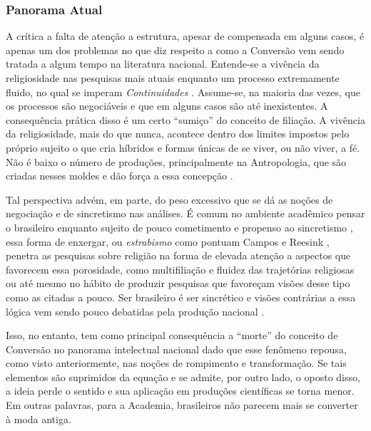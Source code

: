 \documentclass[
	12pt,				%
	oneside,			%
	a4paper,			%
	sumario=tradicional,
	english,			%
	brazil				%
	]{abntex2}
\begin{document}
\hypertarget{panorama-atual}{%
\subsubsection{Panorama Atual}\label{panorama-atual}}

A crítica a falta de atenção a estrutura, apesar de compensada em alguns casos, é apenas um dos problemas no que diz respeito a como a Conversão vem sendo tratada a algum tempo na literatura nacional. Entende-se a vivência da religiosidade nas pesquisas mais atuais enquanto um processo extremamente fluido, no qual se imperam \emph{Continuidades} \autocite{almeida_transito_2001}. Assume-se, na maioria das vezes, que os processos são negociáveis e que em alguns casos são até inexistentes. A consequência prática disso é um certo ``sumiço'' do conceito de filiação. A vivência da religiosidade, mais do que nunca, acontece dentro dos limites impostos pelo próprio sujeito o que cria híbridos e formas únicas de se viver, ou não viver, a fé. Não é baixo o número de produções, principalmente na Antropologia, que são criadas nesses moldes e dão força a essa concepção \autocite{oro_o_2006,reinhardt_espelho_2006,aureliano_eu_2021}.

Tal perspectiva advém, em parte, do peso excessivo que se dá as noções de negociação e de sincretismo nas análises. É comum no ambiente acadêmico pensar o brasileiro enquanto sujeito de pouco cometimento e propenso ao sincretismo \autocite[232]{frigerio_identidades_2005}, essa forma de enxergar, ou \emph{estrabismo} como pontuam Campos e Reesink \autocite*[55]{reesink_conversao_2014}, penetra as pesquisas sobre religião na forma de elevada atenção a aspectos que favorecem essa porosidade, como multifiliação e fluidez das trajetórias religiosas ou até mesmo no hábito de produzir pesquisas que favoreçam visões desse tipo como as citadas a pouco. Ser brasileiro é ser sincrético e visões contrárias a essa lógica vem sendo pouco debatidas pela produção nacional \autocite{reesink_conversao_2014}.

Isso, no entanto, tem como principal consequência a ``morte'' do conceito de Conversão no panorama intelectual nacional \autocite{reesink_conversao_2014} dado que esse fenômeno repousa, como visto anteriormente, nas noções de rompimento e transformação. Se tais elementos são suprimidos da equação e se admite, por outro lado, o oposto disso, a ideia perde o sentido e sua aplicação em produções científicas se torna menor. Em outras palavras, para a Academia, brasileiros não parecem mais se converter à moda antiga.
\end{document}
